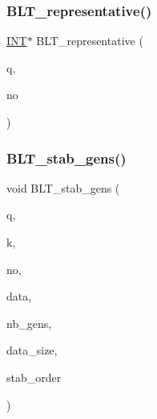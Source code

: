 \subsubsection{\texorpdfstring{B\+L\+T\+\_\+representative()}{BLT\_representative()}}
{\footnotesize\ttfamily \mbox{\hyperlink{galois_8h_a09fddde158a3a20bd2dcadb609de11dc}{I\+NT}}$\ast$ B\+L\+T\+\_\+representative (\begin{DoxyParamCaption}\item[{\mbox{\hyperlink{galois_8h_a09fddde158a3a20bd2dcadb609de11dc}{I\+NT}}}]{q,  }\item[{\mbox{\hyperlink{galois_8h_a09fddde158a3a20bd2dcadb609de11dc}{I\+NT}}}]{no }\end{DoxyParamCaption})}

\mbox{\label{data_8_c_a650fd68ea4381fdd5b7845ec5c7a0a9f}} 
\subsubsection{\texorpdfstring{B\+L\+T\+\_\+stab\+\_\+gens()}{BLT\_stab\_gens()}}
{\footnotesize\ttfamily void B\+L\+T\+\_\+stab\+\_\+gens (\begin{DoxyParamCaption}\item[{\mbox{\hyperlink{galois_8h_a09fddde158a3a20bd2dcadb609de11dc}{I\+NT}}}]{q,  }\item[{\mbox{\hyperlink{galois_8h_a09fddde158a3a20bd2dcadb609de11dc}{I\+NT}}}]{k,  }\item[{\mbox{\hyperlink{galois_8h_a09fddde158a3a20bd2dcadb609de11dc}{I\+NT}}}]{no,  }\item[{\mbox{\hyperlink{galois_8h_a09fddde158a3a20bd2dcadb609de11dc}{I\+NT}} $\ast$\&}]{data,  }\item[{\mbox{\hyperlink{galois_8h_a09fddde158a3a20bd2dcadb609de11dc}{I\+NT}} \&}]{nb\+\_\+gens,  }\item[{\mbox{\hyperlink{galois_8h_a09fddde158a3a20bd2dcadb609de11dc}{I\+NT}} \&}]{data\+\_\+size,  }\item[{const \mbox{\hyperlink{galois_8h_ab6cc7b4aeb6ea31aba2b3fbfc83ff5e6}{B\+Y\+TE}} $\ast$\&}]{stab\+\_\+order }\end{DoxyParamCaption})}

\mbox{\label{data_8_c_ac547a6cfda0a07b0ba4841689c95397f}} 
